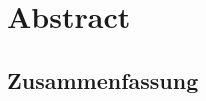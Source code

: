 \begingroup
\let\clearpage\relax
\let\cleardoublepage\relax
\let\cleardoublepage\relax

\chapter*{Abstract}
%



\vfill

\begin{otherlanguage}{ngerman}
\chapter*{Zusammenfassung}


\end{otherlanguage}
\endgroup			
\vfill